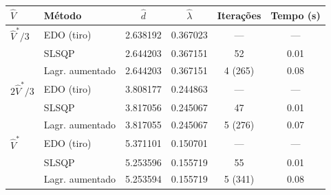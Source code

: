 \begin{tabular}{llcccc}
\toprule
$\hat V$ & Método & $\hat d$ & $\hat\lambda$ & Iterações & Tempo (s) \\
\midrule
$\hat V^*/3$ & EDO (tiro) & \num{2.638192} & \num{0.367023} & --- & --- \\
 & SLSQP & \num{2.644203} & \num{0.367151} & 52 & \num{0.01} \\
 & Lagr. aumentado & \num{2.644203} & \num{0.367151} & 4 (265) & \num{0.08} \\
\midrule
$2\hat V^*/3$ & EDO (tiro) & \num{3.808177} & \num{0.244863} & --- & --- \\
 & SLSQP & \num{3.817056} & \num{0.245067} & 47 & \num{0.01} \\
 & Lagr. aumentado & \num{3.817055} & \num{0.245067} & 5 (276) & \num{0.07} \\
\midrule
$\hat V^*$ & EDO (tiro) & \num{5.371101} & \num{0.150701} & --- & --- \\
 & SLSQP & \num{5.253596} & \num{0.155719} & 55 & \num{0.01} \\
 & Lagr. aumentado & \num{5.253594} & \num{0.155719} & 5 (341) & \num{0.08} \\
\bottomrule
\end{tabular}
